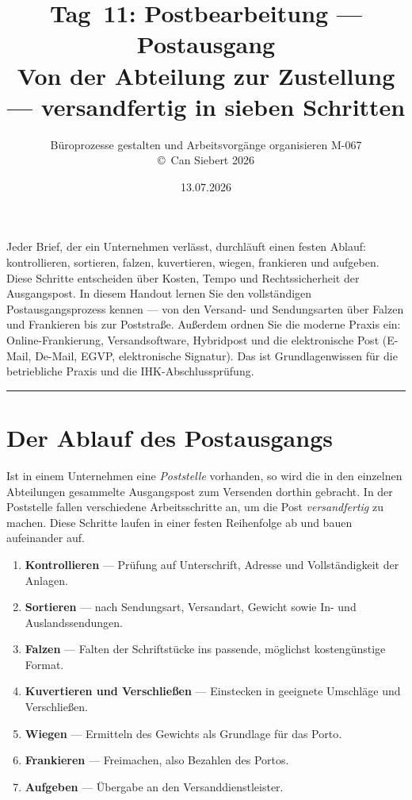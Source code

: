 \documentclass[11pt, a4paper]{article}
\title{\vspace*{-1.5cm}\Huge\bfseries\color{bfwPrimaryDark}Tag~11: Postbearbeitung --- Postausgang\\[0.4em]
  \large\color{bfwInkSoft}\textnormal{Von der Abteilung zur Zustellung --- versandfertig in sieben Schritten}}
\author{\textsf{Büroprozesse gestalten und Arbeitsvorgänge organisieren \textperiodcentered{} M-067}\\
\textsf{\small\copyright\ Can Siebert\,\textperiodcentered\,2026}}
\date{13.07.2026}
\begin{document}
\maketitle
\thispagestyle{empty}

\vspace{1em}
\begin{merksatz}[title={\bfseries Worum geht es heute?}]
Jeder Brief, der ein Unternehmen verlässt, durchläuft einen festen Ablauf: kontrollieren,
sortieren, falzen, kuvertieren, wiegen, frankieren und aufgeben. Diese Schritte
entscheiden über Kosten, Tempo und Rechtssicherheit der Ausgangspost. In diesem Handout
lernen Sie den vollständigen Postausgangsprozess kennen --- von den Versand- und
Sendungsarten über Falzen und Frankieren bis zur Poststraße. Außerdem ordnen Sie die
moderne Praxis ein: Online-Frankierung, Versandsoftware, Hybridpost und die elektronische
Post (E-Mail, De-Mail, EGVP, elektronische Signatur). Das ist Grundlagenwissen für die
betriebliche Praxis und die IHK-Abschlussprüfung.
\end{merksatz}

\tableofcontents
\vspace{1em}
\hrule
\vspace{1em}

\section{Der Ablauf des Postausgangs}

Ist in einem Unternehmen eine \emph{Poststelle} vorhanden, so wird die in den einzelnen
Abteilungen gesammelte Ausgangspost zum Versenden dorthin gebracht. In der Poststelle
fallen verschiedene Arbeitsschritte an, um die Post \emph{versandfertig} zu machen. Diese
Schritte laufen in einer festen Reihenfolge ab und bauen aufeinander auf.

\begin{enumerate}
  \item \textbf{Kontrollieren} --- Prüfung auf Unterschrift, Adresse und Vollständigkeit der Anlagen.
  \item \textbf{Sortieren} --- nach Sendungsart, Versandart, Gewicht sowie In- und Auslandssendungen.
  \item \textbf{Falzen} --- Falten der Schriftstücke ins passende, möglichst kostengünstige Format.
  \item \textbf{Kuvertieren und Verschließen} --- Einstecken in geeignete Umschläge und Verschließen.
  \item \textbf{Wiegen} --- Ermitteln des Gewichts als Grundlage für das Porto.
  \item \textbf{Frankieren} --- Freimachen, also Bezahlen des Portos.
  \item \textbf{Aufgeben} --- Übergabe an den Versanddienstleister.
\end{enumerate}
\end{document}
